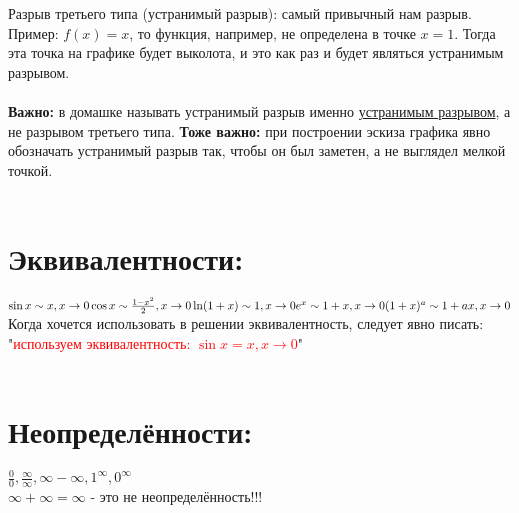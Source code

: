 \documentclass[a4paper,11pt]{report}
\begin{document}
Разрыв третьего типа (устранимый разрыв): самый привычный нам разрыв. 
Пример: $f(x) = x$, то функция, например, не определена в точке $x = 1$. 
Тогда эта точка на графике будет выколота, и это как раз и будет являться устранимым разрывом.\\
\\
\textbf{Важно:} в домашке называть устранимый разрыв именно \underline{устранимым разрывом},
а не разрывом третьего типа. \textbf{Тоже важно:} при построении эскиза графика явно обозначать
устранимый разрыв так, чтобы он был заметен, а не выглядел мелкой точкой.\\
\\
\section{Эквивалентности:}
$
\sin{x} \sim x, x\to0\\
\cos{x} \sim \frac{1 - x^2}{2}, x\to0 \\
\ln(1+x) \sim 1, x\to0 \\
e^x \sim 1 + x, x\to0 \\
(1 + x)^a \sim 1 + ax, x\to0 \\
$\\
Когда хочется использовать в решении эквивалентность, следует явно писать:
"\textcolor{red}{используем эквивалентность: $\sin{x}=x, x\to0$}"\\
\\
\section{Неопределённости:}
$\frac{0}{0}, \frac{\infty}{\infty}, \infty - \infty, 1^{\infty}, 0^{\infty}$\\
$\infty + \infty = \infty$ - это не неопределённость!!!\\
\end{document}
